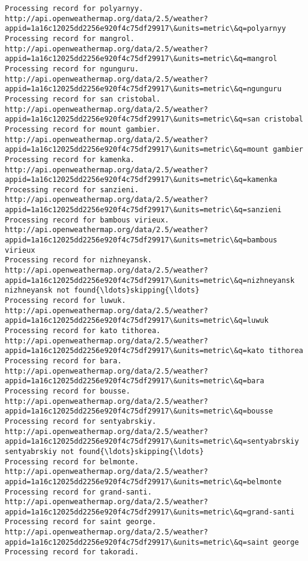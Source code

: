 \documentclass[11pt]{article}
\begin{document}
\begin{Verbatim}[commandchars=\\\{\}]
Processing record for polyarnyy.
http://api.openweathermap.org/data/2.5/weather?appid=1a16c12025dd2256e920f4c75df29917\&units=metric\&q=polyarnyy
Processing record for mangrol.
http://api.openweathermap.org/data/2.5/weather?appid=1a16c12025dd2256e920f4c75df29917\&units=metric\&q=mangrol
Processing record for ngunguru.
http://api.openweathermap.org/data/2.5/weather?appid=1a16c12025dd2256e920f4c75df29917\&units=metric\&q=ngunguru
Processing record for san cristobal.
http://api.openweathermap.org/data/2.5/weather?appid=1a16c12025dd2256e920f4c75df29917\&units=metric\&q=san cristobal
Processing record for mount gambier.
http://api.openweathermap.org/data/2.5/weather?appid=1a16c12025dd2256e920f4c75df29917\&units=metric\&q=mount gambier
Processing record for kamenka.
http://api.openweathermap.org/data/2.5/weather?appid=1a16c12025dd2256e920f4c75df29917\&units=metric\&q=kamenka
Processing record for sanzieni.
http://api.openweathermap.org/data/2.5/weather?appid=1a16c12025dd2256e920f4c75df29917\&units=metric\&q=sanzieni
Processing record for bambous virieux.
http://api.openweathermap.org/data/2.5/weather?appid=1a16c12025dd2256e920f4c75df29917\&units=metric\&q=bambous virieux
Processing record for nizhneyansk.
http://api.openweathermap.org/data/2.5/weather?appid=1a16c12025dd2256e920f4c75df29917\&units=metric\&q=nizhneyansk
nizhneyansk not found{\ldots}skipping{\ldots}
Processing record for luwuk.
http://api.openweathermap.org/data/2.5/weather?appid=1a16c12025dd2256e920f4c75df29917\&units=metric\&q=luwuk
Processing record for kato tithorea.
http://api.openweathermap.org/data/2.5/weather?appid=1a16c12025dd2256e920f4c75df29917\&units=metric\&q=kato tithorea
Processing record for bara.
http://api.openweathermap.org/data/2.5/weather?appid=1a16c12025dd2256e920f4c75df29917\&units=metric\&q=bara
Processing record for bousse.
http://api.openweathermap.org/data/2.5/weather?appid=1a16c12025dd2256e920f4c75df29917\&units=metric\&q=bousse
Processing record for sentyabrskiy.
http://api.openweathermap.org/data/2.5/weather?appid=1a16c12025dd2256e920f4c75df29917\&units=metric\&q=sentyabrskiy
sentyabrskiy not found{\ldots}skipping{\ldots}
Processing record for belmonte.
http://api.openweathermap.org/data/2.5/weather?appid=1a16c12025dd2256e920f4c75df29917\&units=metric\&q=belmonte
Processing record for grand-santi.
http://api.openweathermap.org/data/2.5/weather?appid=1a16c12025dd2256e920f4c75df29917\&units=metric\&q=grand-santi
Processing record for saint george.
http://api.openweathermap.org/data/2.5/weather?appid=1a16c12025dd2256e920f4c75df29917\&units=metric\&q=saint george
Processing record for takoradi.

\end{Verbatim}
\end{document}

